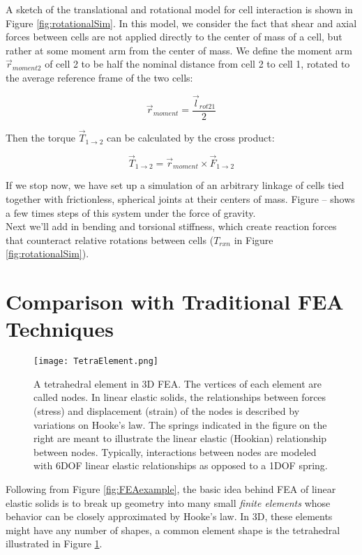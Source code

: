 {A sketch of the translational and rotational model for cell interaction is shown in Figure \ref{fig:rotationalSim}.  In this model, we consider the fact that shear and axial forces between cells are not applied directly to the center of mass of a cell, but rather at some moment arm from the center of mass.  We define the moment arm $\vec{r}_{moment2}$ of cell 2 to be half the nominal distance from cell 2 to cell 1, rotated to the average reference frame of the two cells:

\[ \vec{r}_{moment} = \dfrac{\vec{l}_{rot21}}{2}\]

Then the torque $\vec{T}_{1\rightarrow2}$ can be calculated by the cross product:

\[ \vec{T}_{1\rightarrow2} =  \vec{r}_{moment} \times \vec{F}_{1\rightarrow2}\]

If we stop now, we have set up a simulation of an arbitrary linkage of cells tied together with frictionless, spherical joints at their centers of mass.  Figure -- shows a few times steps of this system under the force of gravity.\\

Next we'll add in bending and torsional stiffness, which create reaction forces that counteract relative rotations between cells ($T_{rxn}$ in Figure \ref{fig:rotationalSim}).  \\

\section{Comparison with Traditional FEA Techniques}

\begin{figure}
  \texttt{[image: TetraElement.png]}
  \caption{A tetrahedral element in 3D FEA.  The vertices of each element are called nodes.  In linear elastic solids, the relationships between forces (stress) and displacement (strain) of the nodes is described by variations on Hooke's law.  The springs indicated in the figure on the right are meant to illustrate the linear elastic (Hookian) relationship between nodes.  Typically, interactions between nodes are modeled with 6DOF linear elastic relationships as opposed to a 1DOF spring.}
  \label{fig:TetraElement}
\end{figure}

Following from Figure \ref{fig:FEAexample}, the basic idea behind FEA of linear elastic solids is to break up geometry into many small \textit{finite elements} whose behavior can be closely approximated by Hooke's law.  In 3D, these elements might have any number of shapes, a common element shape is the tetrahedral illustrated in Figure \ref{fig:TetraElement}.\\

}
